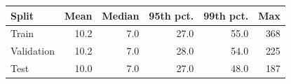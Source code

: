 \begin{tabular}{lrrrrr}
\toprule
Split & Mean & Median & 95th pct. & 99th pct. & Max \\
\midrule
Train & 10.2 & 7.0 & 27.0 & 55.0 & 368 \\
Validation & 10.2 & 7.0 & 28.0 & 54.0 & 225 \\
Test & 10.0 & 7.0 & 27.0 & 48.0 & 187 \\
\bottomrule
\end{tabular}
